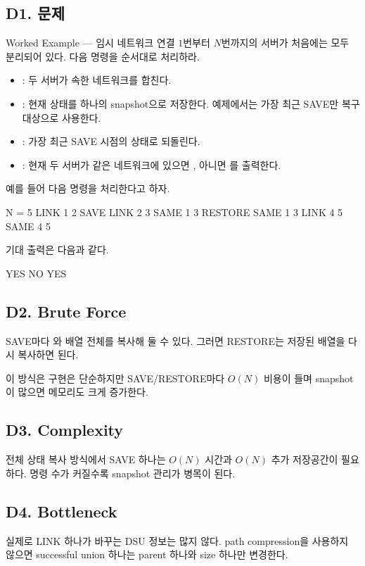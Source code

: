 \subsection*{D1. 문제}
\begin{problembox}{Worked Example --- 임시 네트워크 연결}
$1$번부터 $N$번까지의 서버가 처음에는 모두 분리되어 있다. 다음 명령을 순서대로 처리하라.
\begin{itemize}
\item {}: 두 서버가 속한 네트워크를 합친다.
\item {}: 현재 상태를 하나의 snapshot으로 저장한다. 예제에서는 가장 최근 SAVE만 복구 대상으로 사용한다.
\item {}: 가장 최근 SAVE 시점의 상태로 되돌린다.
\item {}: 현재 두 서버가 같은 네트워크에 있으면 , 아니면 를 출력한다.
\end{itemize}
\end{problembox}

예를 들어 다음 명령을 처리한다고 하자.
\begin{TextBlock}
N = 5
LINK 1 2
SAVE
LINK 2 3
SAME 1 3
RESTORE
SAME 1 3
LINK 4 5
SAME 4 5
\end{TextBlock}

기대 출력은 다음과 같다.
\begin{TextBlock}
YES
NO
YES
\end{TextBlock}

\subsection*{D2. Brute Force}
SAVE마다 와  배열 전체를 복사해 둘 수 있다. 그러면 RESTORE는 저장된 배열을 다시 복사하면 된다.

이 방식은 구현은 단순하지만 SAVE/RESTORE마다 $O(N)$ 비용이 들며 snapshot이 많으면 메모리도 크게 증가한다.

\subsection*{D3. Complexity}
전체 상태 복사 방식에서 SAVE 하나는 $O(N)$ 시간과 $O(N)$ 추가 저장공간이 필요하다. 명령 수가 커질수록 snapshot 관리가 병목이 된다.

\subsection*{D4. Bottleneck}
실제로 LINK 하나가 바꾸는 DSU 정보는 많지 않다. path compression을 사용하지 않으면 successful union 하나는 parent 하나와 size 하나만 변경한다.

